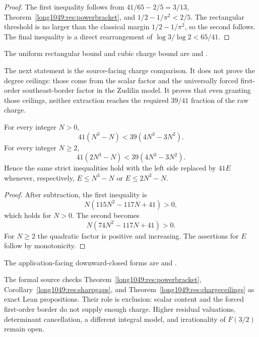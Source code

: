 \documentclass[11pt]{article}
\begin{document}
\begin{proof}
The first inequality follows from
$41/65-2/5=3/13$, Theorem~\ref{long1049:res:powerbracket}, and
$1/2-1/\pi^2<2/5$.  The rectangular threshold is no larger than the classical
margin $1/2-1/\pi^2$, so the second follows.  The final inequality is a direct
rearrangement of $\log3/\log2<65/41$.
\end{proof}

\noindent The uniform rectangular bound and cubic charge bound are
and
.

The next statement is the source-facing charge comparison.  It does not prove
the degree ceilings: those come from the scalar factor and the universally
forced first-order southeast-border factor in the Zudilin model.  It proves
that even granting those ceilings, neither extraction reaches the required
$39/41$ fraction of the raw charge.

\begin{theorem}\label{long1049:res:chargeceilings}
For every integer $N>0$,
\[
 41(N^3-N)<39(4N^3-3N^2).
\]
For every integer $N\ge2$,
\[
 41(2N^3-N)<39(4N^3-3N^2).
\]
Hence the same strict inequalities hold with the left side replaced by
$41E$ whenever, respectively, $E\le N^3-N$ or $E\le2N^3-N$.
\end{theorem}

\begin{proof}
After subtraction, the first inequality is
\[
 N(115N^2-117N+41)>0,
\]
which holds for $N>0$.  The second becomes
\[
 N(74N^2-117N+41)>0.
\]
For $N\ge2$ the quadratic factor is positive and increasing.  The assertions
for $E$ follow by monotonicity.
\end{proof}

\noindent The application-facing downward-closed forms are
and
.

The formal source checks Theorem~\ref{long1049:res:powerbracket},
Corollary~\ref{long1049:res:sharpgaps}, and Theorem~\ref{long1049:res:chargeceilings} as exact
Lean propositions.  Their role is exclusion: scalar content and the forced
first-order border do not supply enough charge.  Higher residual valuations,
determinant cancellation, a different integral model, and irrationality of
$F(3/2)$ remain open.
\end{document}
